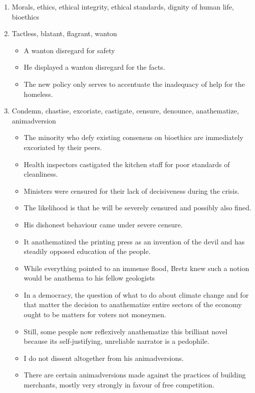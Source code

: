 \documentclass[oneside]{book}
\begin{document}
  \begin{enumerate}
    \item Morals, ethics, ethical integrity, ethical standards, dignity of human life, bioethics
    \item Tactless, blatant, flagrant, wanton
    \begin{itemize}
        \item A wanton disregard for safety
        \item He displayed a wanton disregard for the facts.
        \item The new policy only serves to accentuate the inadequacy of help for the homeless.
    \end{itemize}
    \item Condemn, chastise, excoriate, castigate, censure, denounce, anathematize, animadversion
    \begin{itemize}
        \item The minority who defy existing consensus on bioethics are immediately excoriated by their peers.
        \item Health inspectors castigated the kitchen staff for poor standards of cleanliness.  
        \item Ministers were censured for their lack of decisiveness during the crisis. 
        \item The likelihood is that he will be severely censured and possibly also fined.
        \item His dishonest behaviour came under severe censure.
        \item It anathematized the printing press as an invention of the devil and has steadily opposed education of the people.
        \item While everything pointed to an immense flood, Bretz knew such a notion would be anathema to his fellow geologists
        \item In a democracy, the question of what to do about climate change and for that matter the decision to anathematize entire sectors of the economy ought to be matters for voters not moneymen.
        \item Still, some people now reflexively anathematize this brilliant novel because its self-justifying, unreliable narrator is a pedophile.
        \item I do not dissent altogether from his animadversions.
        \item There are certain animadversions made against the practices of building merchants, mostly very strongly in favour of free competition.

\end{itemize}
\end{enumerate}
\end{document}
